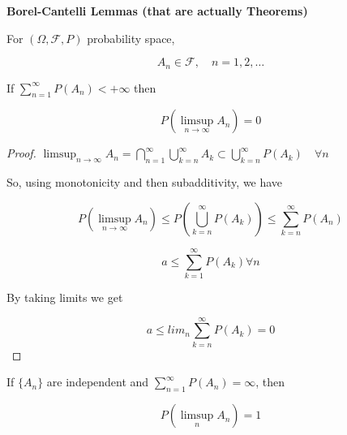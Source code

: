 \documentclass[11pt,fleqn]{book} %
\begin{document}
\textbf{Borel-Cantelli Lemmas (that are actually Theorems)}


\begin{theorem}[BC1]	
	For $(\Omega, \mathcal{F}, P)$ probability space, 

	$$A_n \in \mathcal{F}, \quad n= 1, 2, \dots$$

	If $\displaystyle \sum^\infty_{n=1} P(A_n) < + \infty$ then

	$$P(\limsup_{n \rightarrow \infty} A_n) = 0 $$
\end{theorem}	

\begin{proof}
	$\limsup_{n \rightarrow \infty} A_n = \bigcap^\infty_{n=1} \bigcup^\infty_{k=n} A_k \subset \bigcup^\infty_{k=n} P(A_k) \quad \forall n$

	So, using monotonicity and then subadditivity, we have

			$$P(\limsup_{n \rightarrow \infty} A_n) \leq P( \bigcup^\infty_{k=n} P(A_k)) \leq \sum^\infty_{k=n} P(A_n)$$


			$$a \leq \sum^\infty_{k=1} P(A_k) \forall n $$

	By taking limits we get

			$$a \leq lim_n \sum^\infty_{k=n} P(A_k) = 0$$
\end{proof}

\begin{theorem}[BC2]
	If $\{A_n\}$ are independent and $\displaystyle \sum^\infty_{n=1} P(A_n) = \infty$, then

	$$P(\limsup_n A_n) = 1 $$
\end{theorem}
\end{document}
